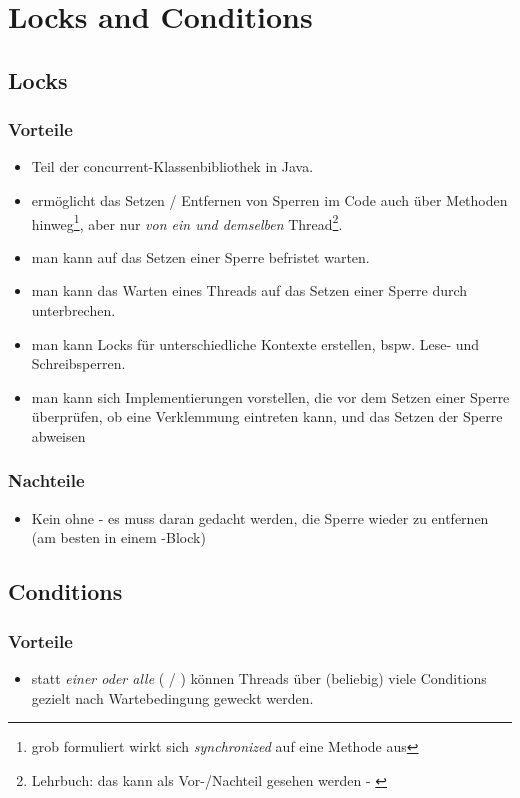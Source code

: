 \section{Locks and Conditions}

\subsection{Locks}

\subsubsection*{Vorteile}

\begin{itemize}
    \item Teil der concurrent-Klassenbibliothek in Java.
    \item ermöglicht das Setzen  / Entfernen  von Sperren im Code auch über Methoden hinweg\footnote{
        grob formuliert wirkt sich \textit{synchronized} auf eine Methode aus
    }, aber nur \textit{von ein und demselben} Thread\footnote{Lehrbuch: das kann als Vor-/Nachteil gesehen werden - \cite[149]{Oec22}}.
    \item man kann auf das Setzen einer Sperre befristet warten.
    \item man kann das Warten eines Threads auf das Setzen einer Sperre durch  unterbrechen.
    \item man kann Locks für unterschiedliche Kontexte erstellen, bspw. Lese- und Schreibsperren.
    \item man kann sich Implementierungen vorstellen, die vor dem Setzen einer Sperre überprüfen, ob eine Verklemmung eintreten kann, und das Setzen der Sperre abweisen
\end{itemize}


\subsubsection*{Nachteile}
\begin{itemize}
    \item Kein  ohne  - es muss daran gedacht werden, die Sperre wieder zu entfernen (am besten in einem -Block)
\end{itemize}

\subsection{Conditions}

\subsubsection*{Vorteile}

\begin{itemize}
    \item statt \textit{einer oder alle} ( / ) können Threads über (beliebig) viele Conditions gezielt nach Wartebedingung geweckt werden.
\end{itemize}
